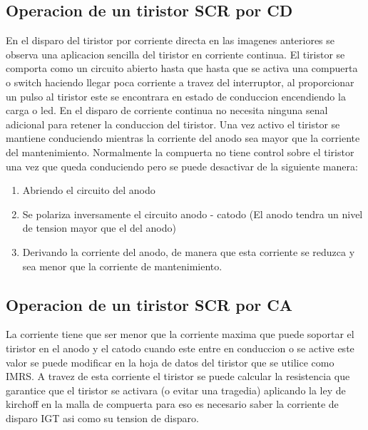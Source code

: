 \documentclass[11pt,a4paper]{article}
\begin{document}
\subsection{Operacion de un tiristor SCR por CD}
En el disparo del tiristor por corriente directa en las imagenes anteriores se observa una aplicacion sencilla del tiristor en corriente continua. El tiristor se comporta como un circuito abierto hasta que hasta que se activa una compuerta o switch haciendo llegar poca corriente a travez del interruptor, al proporcionar un pulso al tiristor este se encontrara en estado de conduccion encendiendo la carga o led. En el disparo de corriente continua no necesita ninguna senal adicional para retener la conduccion del tiristor. Una vez activo el tiristor se mantiene conduciendo mientras la corriente del anodo sea mayor que la corriente del mantenimiento. Normalmente la compuerta no tiene control sobre el tiristor una vez que queda conduciendo pero se puede desactivar de la siguiente manera: \begin{enumerate}
\item Abriendo el circuito del anodo
\item Se polariza inversamente el circuito anodo - catodo (El anodo tendra un nivel de tension mayor que el del anodo)
\item Derivando la corriente del anodo, de manera que esta corriente se reduzca y sea menor que la corriente de mantenimiento.
\end{enumerate}

\subsection{Operacion de un tiristor SCR por CA}
La corriente tiene que ser menor que la corriente maxima que puede soportar el tiristor en el anodo y el catodo cuando este entre en conduccion o se active este valor se puede modificar en la hoja de datos del tiristor que se utilice como IMRS. A travez de esta corriente el tiristor se puede calcular la resistencia que garantice que el tiristor se activara (o evitar una tragedia) aplicando la ley de kirchoff en la malla de compuerta para eso es necesario saber la corriente de disparo IGT asi como su tension de disparo. 
\end{document}
